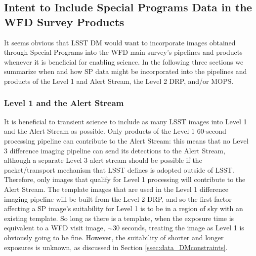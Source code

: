 \documentclass[DM,lsstdraft,toc]{lsstdoc}
\begin{document}


\subsection{Intent to Include Special Programs Data in the WFD Survey Products}\label{ssec:dmplans_WFD}

It seems obvious that LSST DM would want to incorporate images obtained through Special Programs into the WFD main survey's pipelines and products whenever it is beneficial for enabling science. In the following three sections we summarize when and how SP data might be incorporated into the pipelines and products of the Level 1 and Alert Stream, the Level 2 DRP, and/or MOPS.

\subsubsection{Level 1 and the Alert Stream}\label{ssec:dmplans_WFD_L1}

It is beneficial to transient science to include as many LSST images into Level 1 and the Alert Stream as possible. Only products of the Level 1 $60$-second processing pipeline can contribute to the Alert Stream: this means that no Level 3 difference imaging pipeline can send its detections to the Alert Stream, although a separate Level 3 alert stream should be possible if the packet/transport mechanism that LSST defines is adopted outside of LSST. Therefore, only images that qualify for Level 1 processing will contribute to the Alert Stream. The template images that are used in the Level 1 difference imaging pipeline will be built from the Level 2 DRP, and so the first factor affecting a SP image's suitability for Level 1 is to be in a region of sky with an existing template. So long as there is a template, when the exposure time is equivalent to a WFD visit image, $\sim 30$ seconds, treating the image as Level 1 is obviously going to be fine. However, the suitability of shorter and longer exposures is unknown, as discussed in Section \ref{ssec:data_DMconstraints}.
\end{document}
